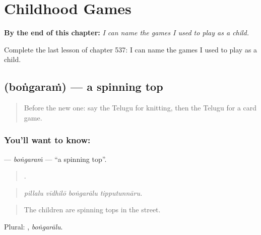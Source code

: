 
\chapter{Childhood Games}
\label{ch:te-childhood-games}

\begin{chapteropening}
\textbf{By the end of this chapter:} \emph{I can name the games I used to play as a child.}

Complete the last lesson of chapter 537: I can name the games I used to play as a child.
\end{chapteropening}

\section[\texorpdfstring{\te{బొంగరం} (boṅgaraṁ)}{బొంగరం (boṅgaraṁ)}]{ (boṅgaraṁ) — a spinning top}

\label{lesson:TE-C537-bongaram}



\begin{quote}
Before the new one: say the Telugu for knitting, then the Telugu for a card game.
\end{quote}

\subsection*{You'll want to know: }
\textbf{} — \emph{boṅgaraṁ} — \textquotedblleft{}a spinning top\textquotedblright{}.

\begin{quote}
   .
\end{quote}

\begin{quote}
\emph{pillalu vīdhilō boṅgarālu tipputunnāru.}
\end{quote}

\begin{quote}
The children are spinning tops in the street.
\end{quote}

Plural: , \emph{boṅgarālu}.

